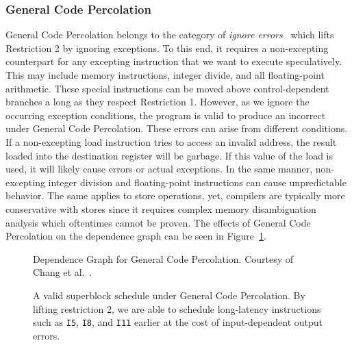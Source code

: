 \subsubsection{General Code Percolation}
General Code Percolation belongs to the category of \textit{ignore errors}~\cite{bringmannMH95} which lifts Restriction 2 by ignoring exceptions. To this end, it requires a non-excepting counterpart for any excepting instruction that we want to execute speculatively. This may include memory instructions, integer divide, and all floating-point arithmetic. These special instructions can be moved above control-dependent branches a long as they respect Restriction 1. However, as we ignore the occurring exception conditions, the program is valid to produce an incorrect under General Code Percolation. These errors can arise from different conditions. If a non-excepting load instruction tries to access an invalid address, the result loaded into the destination register will be garbage. If this value of the load is used, it will likely cause errors or actual exceptions. In the same manner, non-excepting integer division and floating-point instructions can cause unpredictable behavior.  The same applies to store operations, yet, compilers are typically more conservative with stores since it requires complex memory disambiguation analysis which oftentimes cannot be proven. The effects of General Code Percolation on the dependence graph can be seen in Figure~\ref{fig:general_cfg}. 

\begin{center}
    \begin{minipage}{.52\textwidth}
        \begin{figure}[H]
            \centering
            
            \caption[Dependence Graph for General Code Percolation]{Dependence Graph for General Code Percolation. Courtesy of Chang et al.~\cite{chang95}.}
            \label{fig:general_cfg}
\end{figure}
    \end{minipage}\hfill
    \begin{minipage}{.46\textwidth}
\begin{figure}[H]
            \centering
            \resizebox{1\textwidth}{!}{
            
        }
        \caption[Schedule for General Code Percolation]{A valid superblock schedule under General Code Percolation. By lifting restriction 2, we are able to schedule long-latency instructions such as \texttt{I5}, \texttt{I8}, and \texttt{I11} earlier at the cost of input-dependent output errors.}
        \label{fig:general_motion}
\end{figure}
    \end{minipage}
\end{center} 

